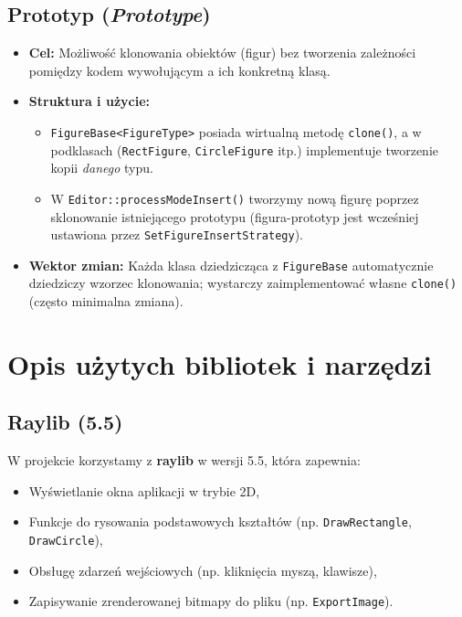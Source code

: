 \documentclass[a4paper,12pt]{article}
\begin{document}
\subsection{Prototyp (\emph{Prototype})}
\begin{itemize}
    \item \textbf{Cel:} Możliwość klonowania obiektów (figur) bez tworzenia zależności
    pomiędzy kodem wywołującym a ich konkretną klasą.
    \item \textbf{Struktura i użycie:}
    \begin{itemize}
      \item \texttt{FigureBase<FigureType>} posiada wirtualną metodę \texttt{clone()},
      a w podklasach (\texttt{RectFigure}, \texttt{CircleFigure} itp.) implementuje 
      tworzenie kopii \emph{danego} typu.
      \item W \texttt{Editor::processModeInsert()} tworzymy nową figurę poprzez
      sklonowanie istniejącego prototypu (figura-prototyp jest wcześniej
      ustawiona przez \texttt{SetFigureInsertStrategy}).
    \end{itemize}
    \item \textbf{Wektor zmian:} Każda klasa dziedzicząca z \texttt{FigureBase}
    automatycznie dziedziczy wzorzec klonowania; 
    wystarczy zaimplementować własne \texttt{clone()} (często minimalna zmiana).
\end{itemize}

\section{Opis użytych bibliotek i narzędzi}

\subsection{Raylib (5.5)}
W projekcie korzystamy z \textbf{raylib} w wersji 5.5, która zapewnia:
\begin{itemize}
    \item Wyświetlanie okna aplikacji w trybie 2D,
    \item Funkcje do rysowania podstawowych kształtów (np. \texttt{DrawRectangle}, \texttt{DrawCircle}),
    \item Obsługę zdarzeń wejściowych (np. kliknięcia myszą, klawisze),
    \item Zapisywanie zrenderowanej bitmapy do pliku (np. \texttt{ExportImage}).
\end{itemize}
\end{document}
